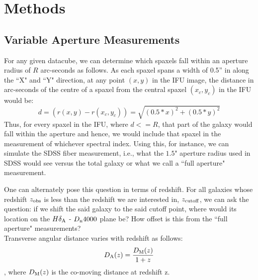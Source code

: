 \section{Methods}
\label{sec:chap2methods}

\subsection{Variable Aperture Measurements}
For any given datacube, we can determine which spaxels fall within an aperture radius of $R$ arc-seconds as follows. As each spaxel spans a width of 0.5'' in along the ``X" and ``Y" direction, at any point $(x,y)$ in the IFU image, the distance in arc-seconds of the centre of a spaxel from the central spaxel $(x_{c},y_{c})$ in the IFU would be:
$$ d = (r(x,y) - r(x_{c},y_{c})) = \sqrt{(0.5*x)^2 + (0.5*y)^2} $$
Thus, for every spaxel in the IFU, where $d<=R$, that part of the galaxy would fall within the aperture and hence, we would include that spaxel in the measurement of whichever spectral index. Using this, for instance, we can simulate the SDSS fiber measurement, i.e.,  what the $1.5$" aperture radius used in SDSS would see versus the total galaxy or what we call a ``full aperture" measurement.


One can alternately pose this question in terms of redshift. For all galaxies whose redshift $z_{\rm obs}$ is less than the redshift we are interested in, $z_{\rm cutoff}$, we can ask the question: if we shift the said galaxy to the said cutoff point, where would its location on the $H\delta_{\rm A}$ - $D_{\rm n}4000$ plane be? How offset is this from the ``full aperture" measurements?\\

Transverse angular distance varies with redshift as follows:
$$D_{\rm A}(z) = \frac{D_{\rm M}(z)}{1+z} $$,
where $D_{\rm M}(z)$ is the co-moving distance at redshift z.

